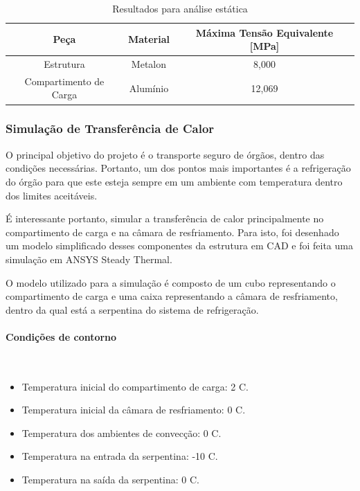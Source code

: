 \begin{table}[H]
	\centering
	\caption{Resultados para análise estática}
	\label{analiseestatica}
	\begin{tabular}{|c|c|c|}
		\hline
		Peça                   & Material & Máxima Tensão Equivalente {[}MPa{]} \\ \hline
		Estrutura              & Metalon  & 8,000                               \\ \hline
		Compartimento de Carga & Alumínio & 12,069                              \\ \hline
	\end{tabular}
\end{table}

\subsubsection{Simulação de Transferência de Calor }

O principal objetivo do projeto é o transporte seguro de órgãos, dentro das condições necessárias. Portanto, um dos pontos mais importantes é a refrigeração do órgão para que este esteja sempre em um ambiente com temperatura dentro dos limites aceitáveis.

É interessante portanto, simular a transferência de calor principalmente no compartimento de carga e na câmara de resfriamento. Para isto, foi desenhado um modelo simplificado desses componentes da estrutura em CAD e foi feita uma simulação em ANSYS Steady Thermal.

O modelo utilizado para a simulação é composto de um cubo representando o compartimento de carga e uma caixa representando a câmara de resfriamento, dentro da qual está a serpentina do sistema de refrigeração.

\paragraph*{Condições de contorno}\

\begin{itemize}
	\item Temperatura inicial do compartimento de carga: 2 \textdegree C.
	\item Temperatura inicial da câmara de resfriamento: 0 \textdegree C.
	\item Temperatura dos ambientes de convecção: 0 \textdegree C.
	\item Temperatura na entrada da serpentina: -10 \textdegree C.
	\item Temperatura na saída da serpentina: 0 \textdegree C.
\end{itemize}

